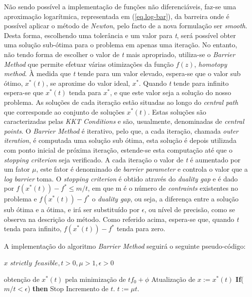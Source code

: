 \documentclass[a4paper]{IEEEtran}
\begin{document}
Não sendo possível a implementação de funções não diferenciáveis, faz-se uma aproximação logarítmica, representada em (\ref{eq.log-bar}), da barreira onde é possível aplicar o método de \textit{Newton}, pelo facto de a nova formulação ser \textit{smooth}. Desta forma, escolhendo uma tolerância e um valor para \textit{t}, será possível obter uma solução sub-ótima para o problema em apenas uma iteração. No entanto, não tendo forma de escolher o valor de \textit{t} mais apropriado, utiliza-se o \textit{Barrier Method} que permite efetuar várias otimizações da função $f(z)$, \textit{homotopy method}.
À medida que \textit{t} tende para um valor elevado, espera-se que o valor sub ótimo, $x^\ast(t)$, se aproxime do valor ideal, $x^\ast$. Quando \textit{t} tende para infinito espera-se que $x^\ast(t)$ tenda para $x^\ast$, e que este valor seja a solução do nosso problema. As soluções de cada iteração estão situadas ao longo do \textit{central path} que corresponde ao conjunto de soluções $x^\ast(t)$. Estas soluções são caracterizadas pelas \textit{KKT Conditions} e são, usualmente, denominadas de \textit{central points}. O \textit{Barrier Method} é iterativo, pelo que, a cada iteração, chamada \textit{outer iteration}, é computada uma solução sub ótima, esta solução é depois utilizada com ponto inicial de próxima iteração, estende-se esta computação até que o \textit{stopping criterion} seja verificado. A cada iteração o valor de \textit{t} é aumentado por um fator $\mu$, este fator é denominado de \textit{barrier parameter} e controla o valor que a \textit{log barrier} toma. O \textit{stopping criterion} é obtido através do \textit{duality gap} e é dado por $f(x^\ast(t))-f^\ast \leq m/t$, em que m é o número de \textit{contraints} existentes no problema e $f(x^\ast(t))-f^\ast$ o \textit{duality gap}, ou seja, a diferença entre a solução sub ótima e a ótima, e irá ser substituído por $\epsilon$, ou nível de precisão, como se observa na descrição do método. Como referido acima, espera-se que, quando \textit{t} tenda para infinito, $f(x^\ast(t))-f^\ast$ tenda para zero.

A implementação do algoritmo \textit{Barrier Method}\cite{BARRIER} seguirá o seguinte pseudo-código:

\begin{algorithmic}[1]
\renewcommand{\algorithmicrequire}{\textbf{Input:}}
\REQUIRE $x \textit{ strictly feasible}, t > 0, \mu > 1, \epsilon > 0$

\STATE obtenção de $x^* (t)$ pela minimização de $t f_0 + \phi$
\STATE Atualização de $x:=x^* (t)$
\STATE \textbf{If}($m/t < \epsilon$) \textbf{then} Stop
\STATE Incremento de $t$. $t:=\mu t$.
\end{algorithmic}
\end{document}
